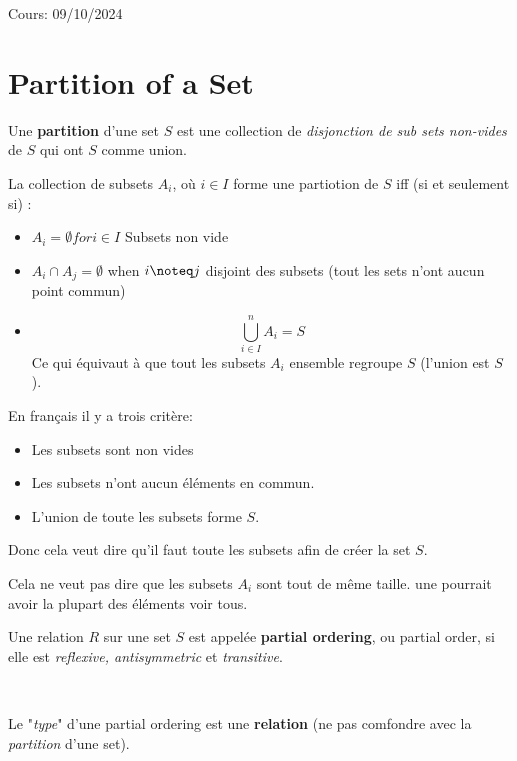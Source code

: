 \begin{framedate}
   Cours: 09/10/2024
\end{framedate}

\section{Partition of a Set}
\begin{definition}[Partition]
    Une \textbf{partition} d'une set $S$ est une collection de \textit{disjonction de sub sets non-vides} de $S$ qui ont $S$ comme union.
\end{definition}
La collection de subsets $A_i$, où $i \in I$ forme une partiotion de $S$ iff (si et seulement si) :
\begin{itemize}

    \item $A_i = \emptyset for i \in I$ \vspace{0.4cm} Subsets non vide
    \item $A_i \cap A_j = \emptyset$ when $i \noteq  j $ \vspace{0.2cm} disjoint des subsets (tout les sets n'ont aucun point commun)
    \item \[\bigcup_{i\in I}^n A_i = S \] Ce qui équivaut à que tout les subsets $A_i$ ensemble regroupe $S$ (l'union est $S$).
\end{itemize}
En français il y a trois critère:
\begin{itemize}
    \item Les subsets sont non vides
    \item Les subsets n'ont aucun éléments en commun.
    \item L'union de toute les subsets forme $S$.

\end{itemize}
Donc cela veut dire qu'il faut toute les subsets afin de créer la set $S$. 
\begin{framedremark}
    Cela ne veut pas dire que les subsets $A_i$ sont tout de même taille. une pourrait avoir la plupart des éléments voir tous.
\end{framedremark}

\hspace{0.4cm}

\begin{definition}
    Une relation $R$ sur une set $S$ est appelée \textbf{partial ordering}, ou partial order, si elle est \textit{reflexive, antisymmetric} et \textit{transitive}.
\end{definition}
\\
\begin{framedremark}
    Le "\textit{type}" d'une partial ordering est une \textbf{relation} (ne pas comfondre avec la \textit{partition} d'une set).
    \end{framedremark}
    
